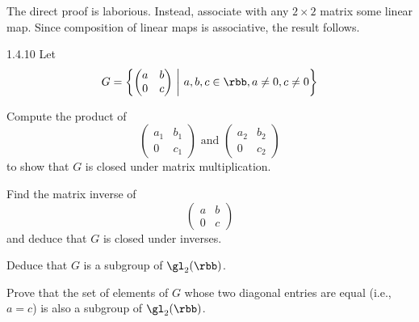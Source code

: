 \begin{sol}
    The direct proof is laborious.
	Instead, associate with any $2 \times 2$ matrix some linear map.
	Since composition of linear maps is associative, the result follows.
\end{sol}

\begin{exercise}{1.4.10}
    Let
    \[
    	G = \left\{
        \begin{pmatrix}
            a & b \\
            0 & c
        \end{pmatrix}~\middle|~a, b, c \in \rbb, a \neq 0, c \neq 0 \right\}
	\]
    \begin{subexercises}
        \item Compute the product of
        \[
            \begin{pmatrix}
                a_1 & b_1 \\
                0 & c_1
            \end{pmatrix} \text{ and }
            \begin{pmatrix}
                a_2 & b_2 \\
                0 & c_2
            \end{pmatrix}
        \]
        to show that $G$ is closed under matrix multiplication.
        \item Find the matrix inverse of
        \[
            \begin{pmatrix}
                a & b \\
                0 & c
            \end{pmatrix}
        \]
        and deduce that $G$ is closed under inverses.
        \item Deduce that $G$ is a subgroup of $\gl_2(\rbb)$.
        \item Prove that the set of elements of $G$ whose two diagonal entries are equal (i.e., $a = c$) is also a subgroup of $\gl_2(\rbb)$.
    \end{subexercises}
\end{exercise}

